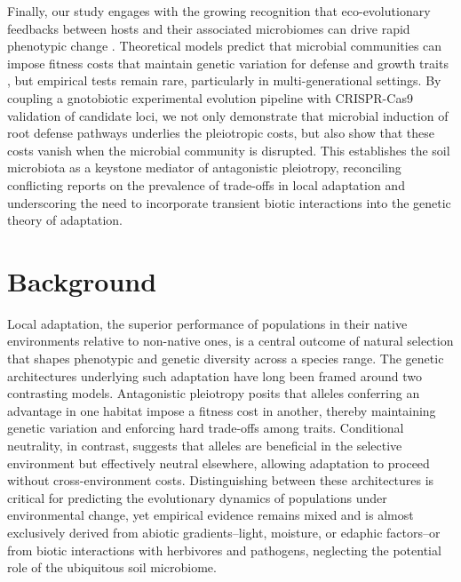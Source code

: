 \documentclass{article}
\begin{document}
Finally, our study engages with the growing recognition that eco-evolutionary feedbacks between hosts and their associated microbiomes can drive rapid phenotypic change \citep{Matthews2011Toward, terHorst2018Eco}.  Theoretical models predict that microbial communities can impose fitness costs that maintain genetic variation for defense and growth traits \citep{Metcalf2019Evolutionary}, but empirical tests remain rare, particularly in multi-generational settings.  By coupling a gnotobiotic experimental evolution pipeline with CRISPR-Cas9 validation of candidate loci, we not only demonstrate that microbial induction of root defense pathways underlies the pleiotropic costs, but also show that these costs vanish when the microbial community is disrupted.  This establishes the soil microbiota as a keystone mediator of antagonistic pleiotropy, reconciling conflicting reports on the prevalence of trade-offs in local adaptation \citep{Hoban2016Finding} and underscoring the need to incorporate transient biotic interactions into the genetic theory of adaptation.

\section{Background}
Local adaptation, the superior performance of populations in their native environments relative to non-native ones, is a central outcome of natural selection that shapes phenotypic and genetic diversity across a species range. The genetic architectures underlying such adaptation have long been framed around two contrasting models. Antagonistic pleiotropy posits that alleles conferring an advantage in one habitat impose a fitness cost in another, thereby maintaining genetic variation and enforcing hard trade-offs among traits. Conditional neutrality, in contrast, suggests that alleles are beneficial in the selective environment but effectively neutral elsewhere, allowing adaptation to proceed without cross-environment costs. Distinguishing between these architectures is critical for predicting the evolutionary dynamics of populations under environmental change, yet empirical evidence remains mixed and is almost exclusively derived from abiotic gradients--light, moisture, or edaphic factors--or from biotic interactions with herbivores and pathogens, neglecting the potential role of the ubiquitous soil microbiome.
\end{document}
